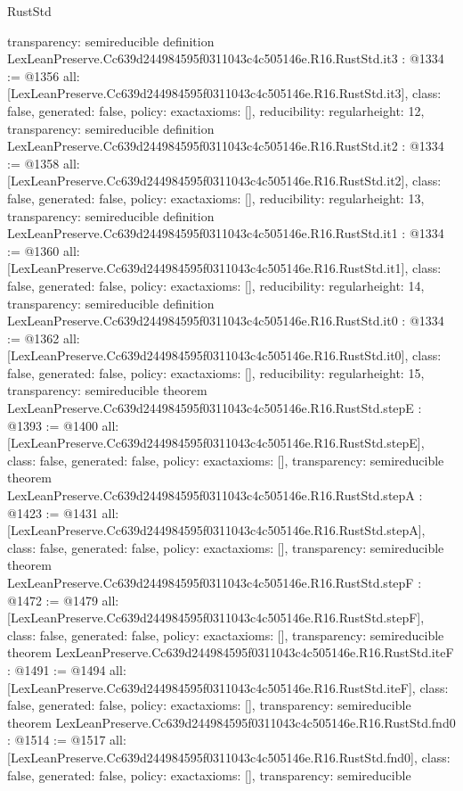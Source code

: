 \begin{lexlean}{RustStd}
\begin{coremodule}
{  transparency: semireducible
}
definition LexLeanPreserve.Cc639d244984595f0311043c4c505146e.R16.RustStd.it3 : @1334 := @1356 {
  all: [LexLeanPreserve.Cc639d244984595f0311043c4c505146e.R16.RustStd.it3],
  class: false,
  generated: false,
  policy: exact{axioms: []},
  reducibility: regular{height: 12},
  transparency: semireducible
}
definition LexLeanPreserve.Cc639d244984595f0311043c4c505146e.R16.RustStd.it2 : @1334 := @1358 {
  all: [LexLeanPreserve.Cc639d244984595f0311043c4c505146e.R16.RustStd.it2],
  class: false,
  generated: false,
  policy: exact{axioms: []},
  reducibility: regular{height: 13},
  transparency: semireducible
}
definition LexLeanPreserve.Cc639d244984595f0311043c4c505146e.R16.RustStd.it1 : @1334 := @1360 {
  all: [LexLeanPreserve.Cc639d244984595f0311043c4c505146e.R16.RustStd.it1],
  class: false,
  generated: false,
  policy: exact{axioms: []},
  reducibility: regular{height: 14},
  transparency: semireducible
}
definition LexLeanPreserve.Cc639d244984595f0311043c4c505146e.R16.RustStd.it0 : @1334 := @1362 {
  all: [LexLeanPreserve.Cc639d244984595f0311043c4c505146e.R16.RustStd.it0],
  class: false,
  generated: false,
  policy: exact{axioms: []},
  reducibility: regular{height: 15},
  transparency: semireducible
}
theorem LexLeanPreserve.Cc639d244984595f0311043c4c505146e.R16.RustStd.stepE : @1393 := @1400 {
  all: [LexLeanPreserve.Cc639d244984595f0311043c4c505146e.R16.RustStd.stepE],
  class: false,
  generated: false,
  policy: exact{axioms: []},
  transparency: semireducible
}
theorem LexLeanPreserve.Cc639d244984595f0311043c4c505146e.R16.RustStd.stepA : @1423 := @1431 {
  all: [LexLeanPreserve.Cc639d244984595f0311043c4c505146e.R16.RustStd.stepA],
  class: false,
  generated: false,
  policy: exact{axioms: []},
  transparency: semireducible
}
theorem LexLeanPreserve.Cc639d244984595f0311043c4c505146e.R16.RustStd.stepF : @1472 := @1479 {
  all: [LexLeanPreserve.Cc639d244984595f0311043c4c505146e.R16.RustStd.stepF],
  class: false,
  generated: false,
  policy: exact{axioms: []},
  transparency: semireducible
}
theorem LexLeanPreserve.Cc639d244984595f0311043c4c505146e.R16.RustStd.iteF : @1491 := @1494 {
  all: [LexLeanPreserve.Cc639d244984595f0311043c4c505146e.R16.RustStd.iteF],
  class: false,
  generated: false,
  policy: exact{axioms: []},
  transparency: semireducible
}
theorem LexLeanPreserve.Cc639d244984595f0311043c4c505146e.R16.RustStd.fnd0 : @1514 := @1517 {
  all: [LexLeanPreserve.Cc639d244984595f0311043c4c505146e.R16.RustStd.fnd0],
  class: false,
  generated: false,
  policy: exact{axioms: []},
  transparency: semireducible
}
\end{coremodule}
\end{lexlean}

